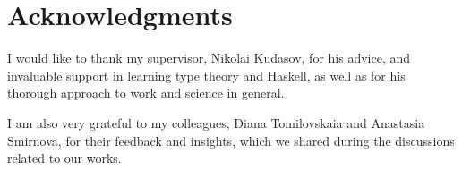 \clearpage
\thispagestyle{empty}
\section*{Acknowledgments}

I would like to thank my supervisor, Nikolai Kudasov, for his advice, and invaluable support in learning type theory and Haskell, as well as for his thorough approach to work and science in general.

I am also very grateful to my colleagues, Diana Tomilovskaia and Anastasia Smirnova, for their feedback and insights, which we shared during the discussions related to our works.
